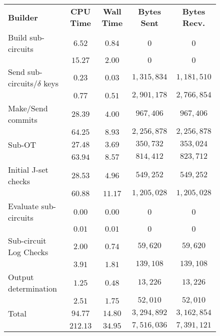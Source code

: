 \documentclass[ %
                    author={Nicholas Tutte},
                supervisor={Prof. Nigel Smart},
                    degree={MEng},
                     title={Secure Two Party Computation},
                  subtitle={A practical comparison of recent protocols},
                      type={Research - GG1K},
                      year={2015} ]{dissertation}
\begin{document}
					\begin{figure}[!ht]
						\begin{tabular}{| p{4.3cm} | c c c c |}
							\hline
							\textbf{Builder} & \textbf{CPU Time} & \textbf{Wall Time} & \textbf{Bytes Sent} & \textbf{Bytes Recv.} \\
							\thickhline
							Build sub-circuits & $6.52$ & $0.84$ & $0$ & $0$ \\
									   & $15.27$ & $2.00$ & $0$ & $0$ \\
							\hline
							Send sub-circuits/$\delta$ keys & $0.23$ & $0.03$ & $1,315,834$ & $1,181,510$ \\
									  & $0.77$ & $0.51$ & $2,901,178$ & $2,766,854$ \\
							\hline
							Make/Send commits & $28.39$ & $4.00$ & $967,406$ & $967,406$ \\
									  & $64.25$ & $8.93$ & $2,256,878$ & $2,256,878$ \\
							\hline
							Sub-OT & $27.48$ & $3.69$ & $350,732$ & $353,024$ \\
							      & $63.94$ & $8.57$ & $814,412$ & $823,712$ \\
							\hline
							Initial J-set checks & $28.53$ & $4.96$ & $549,252$ & $549,252$ \\
									    & $60.88$ & $11.17$ & $1,205,028$ & $1,205,028$ \\
							\hline
							Evaluate sub-circuits & $0.00$ & $0.00$ & $0$ & $0$ \\
									      & $0.01$ & $0.01$ & $0$ & $0$ \\
							\hline
							Sub-circuit Log Checks 	& $2.00$ & $0.74$ & $59,620$ & $59,620$ \\
										& $3.91$ & $1.81$ & $139,108$ & $139,108$ \\
							\hline
							Output determination & $1.25$ & $0.48$ & $13,226$ & $13,226$ \\
									     & $2.51$ & $1.75$ & $52,010$ & $52,010$ \\
							\thickhline
							Total & $94.77$ & $14.80$ & $3,294,892$ & $3,162,854$ \\
							      & $212.13$ & $34.95$ & $7,516,036$ & $7,391,121$ \\
							\hline
						\end{tabular}

						\vspace{0.2cm}


\end{figure}
\end{document}
